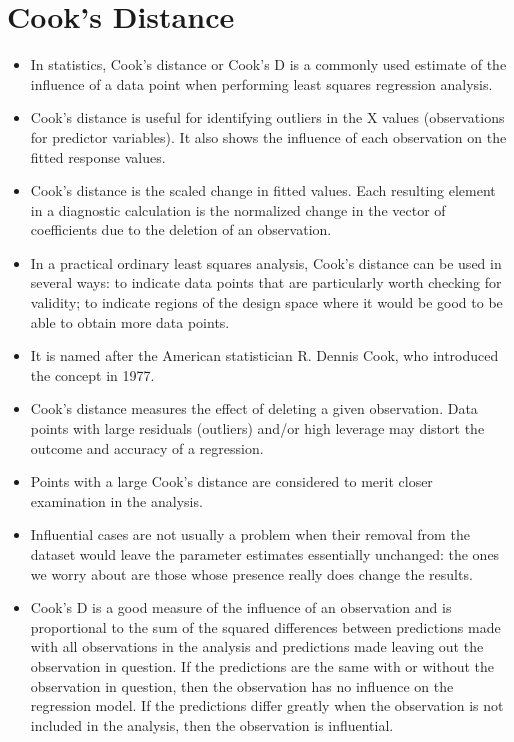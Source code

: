\documentclass[residuals.tex]{subfiles}
\begin{document}
\Large
\section{Cook's Distance}	
	\begin{itemize}
		\item In statistics, Cook's distance or Cook's D is a commonly used estimate of the influence of a data point when performing least squares regression analysis.
		
		\item Cook's distance is useful for identifying outliers in the X values (observations for predictor variables). It also shows the influence of each observation on the fitted response values. 
		
		\item 
		Cook's distance is the scaled change in fitted values. Each resulting element in a diagnostic calculation is the normalized change in the vector of coefficients due to the deletion of an observation. 
		
		\item In a practical ordinary least squares analysis, Cook's distance can be used in several ways: to indicate data points that are particularly worth checking for validity; to indicate regions of the design space where it would be good to be able to obtain more data points. 
		\item 
		It is named after the American statistician R. Dennis Cook, who introduced the concept in 1977.
		
		\item 
		Cook's distance measures the effect of deleting a given observation. Data points with large residuals (outliers) and/or high leverage may distort the outcome and accuracy of a regression. 
		
		\item Points with a large Cook's distance are considered to merit closer examination in the analysis. 
		
		\item Influential cases are not usually a problem when their removal from the dataset would leave the parameter estimates essentially unchanged: the ones we worry about are those whose presence really does change the results. 
		\item 	Cook's D is a good measure of the influence of an observation and is proportional to the sum of the squared differences between predictions made with all observations in the analysis and predictions made leaving out the observation in question. If the predictions are the same with or without the observation in question, then the observation has no influence on the regression model. If the predictions differ greatly when the observation is not included in the analysis, then the observation is influential.
	\end{itemize}
\newpage
\end{document}
